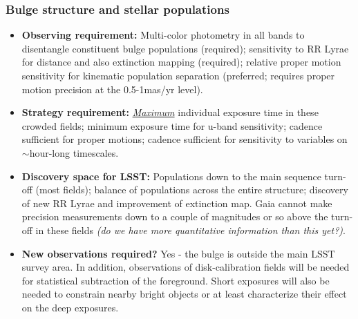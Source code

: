 \subsubsection{Bulge structure and stellar populations}
\vspace{-2mm}
\begin{itemize}
\item {\bf Observing requirement:} Multi-color photometry in all bands to disentangle constituent bulge populations (required); sensitivity to RR Lyrae for distance and also extinction mapping (required); relative proper motion sensitivity for kinematic population separation (preferred; requires proper motion precision at the 0.5-1mas/yr level).
\vspace{-2mm}

\item {\bf Strategy requirement:} \underline{\it Maximum} individual exposure time in these crowded fields; minimum exposure time for u-band sensitivity; cadence sufficient for proper motions; cadence sufficient for sensitivity to variables on $\sim$hour-long timescales.
\vspace{-2mm}

\item {\bf Discovery space for LSST:} Populations down to the main sequence turn-off (most fields); balance of populations across the entire structure; discovery of new RR Lyrae and improvement of extinction map. Gaia cannot make precision measurements down to a couple of magnitudes or so above the turn-off in these fields {\it (do we have more quantitative information than this yet?)}.
\vspace{-2mm}

\item {\bf New observations required?} Yes - the bulge is outside the
  main LSST survey area. In addition, observations of disk-calibration
  fields will be needed for statistical subtraction of the
  foreground. Short exposures will also be needed to constrain nearby
  bright objects or at least characterize their effect on the deep
  exposures.
\vspace{2mm}
\end{itemize}

